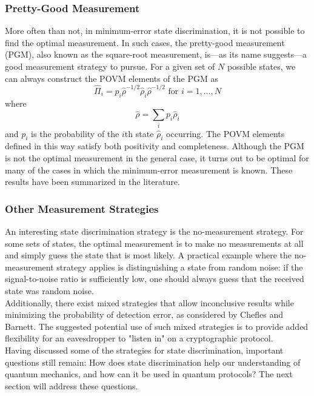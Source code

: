 \subsubsection{Pretty-Good Measurement}
More often than not, in minimum-error state discrimination, it is not possible to find the optimal measurement. In such cases, the pretty-good measurement (PGM), also known as the square-root measurement, is---as its name suggests---a good measurement strategy to pursue. For a given set of $N$ possible states, we can always construct the POVM elements of the PGM as 
\begin{equation}
    \hat{\Pi}_i = p_i \hat{\rho}^{-1/2} \hat{\rho}_i \hat{\rho}^{-1/2} \text{ for } i = 1, \ldots, N
\end{equation}
where 
\begin{equation}
    \hat{\rho} = \sum_i p_i \hat{\rho}_i
\end{equation}
and $p_i$ is the probability of the $i$th state $\hat{\rho}_i$ occurring. The POVM elements defined in this way satisfy both positivity and completeness. Although the PGM is not the optimal measurement in the general case, it turns out to be optimal for many of the cases in which the minimum-error measurement is known. These results have been summarized in the literature.

\subsubsection{Other Measurement Strategies}
An interesting state discrimination strategy is the no-measurement strategy. For some sets of states, the optimal measurement is to make no measurements at all and simply guess the state that is most likely. A practical example where the no-measurement strategy applies is distinguishing a state from random noise: if the signal-to-noise ratio is sufficiently low, one should always guess that the received state was random noise.\\

Additionally, there exist mixed strategies that allow inconclusive results while minimizing the probability of detection error, as considered by Chefles and Barnett. The suggested potential use of such mixed strategies is to provide added flexibility for an eavesdropper to "listen in" on a cryptographic protocol.\\

Having discussed some of the strategies for state discrimination, important questions still remain: How does state discrimination help our understanding of quantum mechanics, and how can it be used in quantum protocols? The next section will address these questions.

